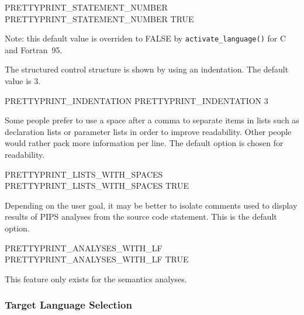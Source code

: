 \documentclass[a4paper]{report}
\begin{document}
\begin{PipsProp}{PRETTYPRINT_STATEMENT_NUMBER}
PRETTYPRINT_STATEMENT_NUMBER TRUE
\end{PipsProp}

Note: this default value is overriden to FALSE by
\verb/activate_language()/ for C and Fortran~95.

The structured control structure is shown by using an indentation. The
default value is 3.

\begin{PipsProp}{PRETTYPRINT_INDENTATION}
PRETTYPRINT_INDENTATION 3
\end{PipsProp}

Some people prefer to use a space after a comma to separate items in
lists such as declaration lists or parameter lists in order to improve
readability. Other people would rather pack more information per
line. The default option is chosen for readability.

\begin{PipsProp}{PRETTYPRINT_LISTS_WITH_SPACES}
PRETTYPRINT_LISTS_WITH_SPACES TRUE
\end{PipsProp}

Depending on the user goal, it may be better to isolate comments used
to display results of PIPS analyses from the source code
statement. This is the default option.

\begin{PipsProp}{PRETTYPRINT_ANALYSES_WITH_LF}
PRETTYPRINT_ANALYSES_WITH_LF TRUE
\end{PipsProp}

This feature only exists for the semantics analyses.

%
\subsubsection{Target Language Selection}
\end{document}
